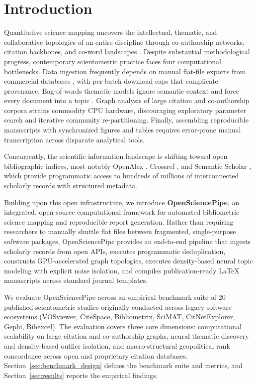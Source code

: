 \documentclass[preprint,12pt]{elsarticle}
\begin{document}
\section{Introduction}
\label{sec:intro}
Quantitative science mapping uncovers the intellectual, thematic, and collaborative topologies of an entire discipline through co-authorship networks, citation backbones, and co-word landscapes \cite{cobo2011science, van2010software, chen2006citespace, aria2017bibliometrix}. Despite substantial methodological progress, contemporary scientometric practice faces four computational bottlenecks. Data ingestion frequently depends on manual flat-file exports from commercial databases \cite{moral2020software}, with per-batch download caps that complicate provenance. Bag-of-words thematic models ignore semantic context and force every document into a topic \cite{blei2003latent, campello2013density, grootendorst2022bertopic}. Graph analysis of large citation and co-authorship corpora strains commodity CPU hardware, discouraging exploratory parameter search and iterative community re-partitioning. Finally, assembling reproducible manuscripts with synchronized figures and tables requires error-prone manual transcription across disparate analytical tools.

Concurrently, the scientific information landscape is shifting toward open bibliographic indices, most notably OpenAlex \cite{priem2022openalex}, Crossref \cite{hendricks2020crossref}, and Semantic Scholar \cite{kinney2023semantic}, which provide programmatic access to hundreds of millions of interconnected scholarly records with structured metadata.

Building upon this open infrastructure, we introduce \textbf{OpenSciencePipe}, an integrated, open-source computational framework for automated bibliometric science mapping and reproducible report generation. Rather than requiring researchers to manually shuttle flat files between fragmented, single-purpose software packages, OpenSciencePipe provides an end-to-end pipeline that ingests scholarly records from open APIs, executes programmatic deduplication, constructs GPU-accelerated graph topologies, executes density-based neural topic modeling with explicit noise isolation, and compiles publication-ready \LaTeX{} manuscripts across standard journal templates.

We evaluate OpenSciencePipe across an empirical benchmark suite of 20 published scientometric studies originally conducted across legacy software ecosystems (VOSviewer, CiteSpace, Bibliometrix, SciMAT, CitNetExplorer, Gephi, Bibexcel). The evaluation covers three core dimensions: computational scalability on large citation and co-authorship graphs, neural thematic discovery and density-based outlier isolation, and macro-structural geopolitical rank concordance across open and proprietary citation databases. Section~\ref{sec:benchmark_design} defines the benchmark suite and metrics, and Section~\ref{sec:results} reports the empirical findings.
\end{document}
